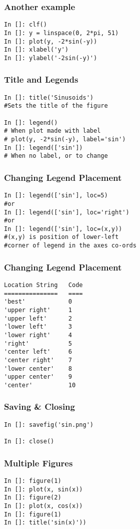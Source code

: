 \documentclass[14pt,compress]{beamer}
\begin{document}
\begin{frame}[fragile]
\frametitle{Another example}
  \begin{lstlisting}
In []: clf()
In []: y = linspace(0, 2*pi, 51)
In []: plot(y, -2*sin(-y))
In []: xlabel('y')
In []: ylabel('-2sin(-y)')
  \end{lstlisting}
\end{frame}

\begin{frame}[fragile]
\frametitle{Title and Legends}
\begin{lstlisting}
In []: title('Sinusoids')
#Sets the title of the figure

In []: legend() 
# When plot made with label
# plot(y, -2*sin(-y), label='sin')
In []: legend(['sin'])
# When no label, or to change

\end{lstlisting}
\end{frame}

\begin{frame}[fragile]
\frametitle{Changing Legend Placement}
\begin{lstlisting}
In []: legend(['sin'], loc=5) 
#or 
In []: legend(['sin'], loc='right') 
#or
In []: legend(['sin'], loc=(x,y)) 
#(x,y) is position of lower-left 
#corner of legend in the axes co-ords
\end{lstlisting}
\end{frame}

\begin{frame}[fragile]
\frametitle{Changing Legend Placement}
\vspace{-0.15in}
\begin{lstlisting}
Location String   Code
===============   ====
'best'            0
'upper right'     1
'upper left'      2
'lower left'      3
'lower right'     4
'right'           5
'center left'     6
'center right'    7
'lower center'    8
'upper center'    9
'center'          10
\end{lstlisting}
\end{frame}


\begin{frame}[fragile]
\frametitle{Saving \& Closing}
\begin{lstlisting}
In []: savefig('sin.png')

In []: close()
\end{lstlisting}
\end{frame}

\begin{frame}[fragile]
\frametitle{Multiple Figures}
\begin{lstlisting}
In []: figure(1)
In []: plot(x, sin(x))
In []: figure(2)
In []: plot(x, cos(x))
In []: figure(1)
In []: title('sin(x)'))
\end{lstlisting}
\end{frame}
\end{document}
